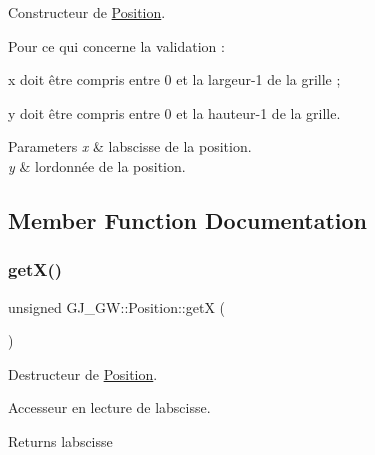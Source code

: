 Constructeur de \hyperlink{class_g_j___g_w_1_1_position}{Position}. 

Pour ce qui concerne la validation \+:
\begin{DoxyItemize}
\item x doit être compris entre 0 et la largeur-\/1 de la grille ;
\item y doit être compris entre 0 et la hauteur-\/1 de la grille.
\end{DoxyItemize}


\begin{DoxyParams}{Parameters}
{\em x} & l\textquotesingle{}abscisse de la position. \\
\hline
{\em y} & l\textquotesingle{}ordonnée de la position. \\
\hline
\end{DoxyParams}


\subsection{Member Function Documentation}
\hypertarget{class_g_j___g_w_1_1_position_a0b6d52cb999972584a19bbd5f72052d2}{}\label{class_g_j___g_w_1_1_position_a0b6d52cb999972584a19bbd5f72052d2} 
\subsubsection{\texorpdfstring{get\+X()}{getX()}}
{\footnotesize\ttfamily unsigned G\+J\+\_\+\+G\+W\+::\+Position\+::getX (\begin{DoxyParamCaption}{ }\end{DoxyParamCaption})\hspace{0.3cm}{\ttfamily [inline]}}



Destructeur de \hyperlink{class_g_j___g_w_1_1_position}{Position}. 

Accesseur en lecture de l\textquotesingle{}abscisse.

\begin{DoxyReturn}{Returns}
l\textquotesingle{}abscisse 
\end{DoxyReturn}
\hypertarget{class_g_j___g_w_1_1_position_adc9a6735a8f67edda3a1d347aa9c8211}{}\label{class_g_j___g_w_1_1_position_adc9a6735a8f67edda3a1d347aa9c8211} 
